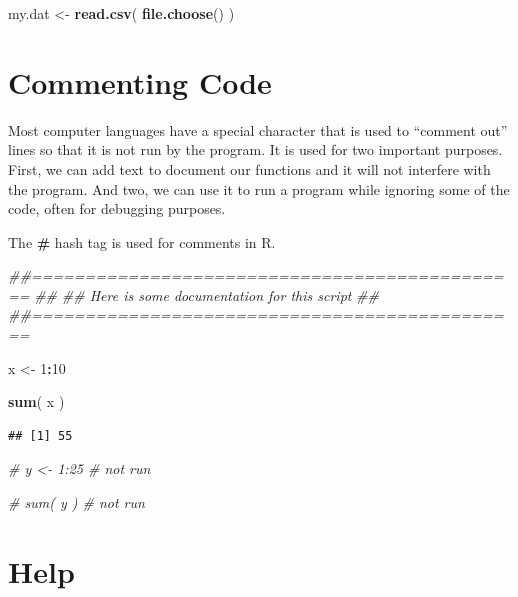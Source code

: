 \documentclass[]{book}
\newenvironment{Shaded}{\begin{snugshade}}{\end{snugshade}}
\newcommand{\CommentTok}[1]{\textcolor[rgb]{0.56,0.35,0.01}{\textit{#1}}}
\newcommand{\DecValTok}[1]{\textcolor[rgb]{0.00,0.00,0.81}{#1}}
\newcommand{\KeywordTok}[1]{\textcolor[rgb]{0.13,0.29,0.53}{\textbf{#1}}}
\newcommand{\NormalTok}[1]{#1}
\newcommand{\OperatorTok}[1]{\textcolor[rgb]{0.81,0.36,0.00}{\textbf{#1}}}
\newcommand{\StringTok}[1]{\textcolor[rgb]{0.31,0.60,0.02}{#1}}
\theoremstyle{definition}
\theoremstyle{definition}
\theoremstyle{definition}
\theoremstyle{remark}
\begin{document}
\begin{Shaded}
\begin{Highlighting}[]
\NormalTok{my.dat <-}\StringTok{ }\KeywordTok{read.csv}\NormalTok{( }\KeywordTok{file.choose}\NormalTok{() )}
\end{Highlighting}
\end{Shaded}

\hypertarget{commenting-code}{%
\section{Commenting Code}\label{commenting-code}}

Most computer languages have a special character that is used to
``comment out'' lines so that it is not run by the program. It is used
for two important purposes. First, we can add text to document our
functions and it will not interfere with the program. And two, we can
use it to run a program while ignoring some of the code, often for
debugging purposes.

The \textbf{\#} hash tag is used for comments in R.

\begin{Shaded}
\begin{Highlighting}[]
\CommentTok{##==============================================}
\CommentTok{##}
\CommentTok{##  Here is some documentation for this script}
\CommentTok{##}
\CommentTok{##==============================================}

\NormalTok{x <-}\StringTok{ }\DecValTok{1}\OperatorTok{:}\DecValTok{10}

\KeywordTok{sum}\NormalTok{( x )}
\end{Highlighting}
\end{Shaded}

\begin{verbatim}
## [1] 55
\end{verbatim}

\begin{Shaded}
\begin{Highlighting}[]
\CommentTok{# y <- 1:25     # not run}

\CommentTok{# sum( y )      # not run}
\end{Highlighting}
\end{Shaded}

\hypertarget{help}{%
\section{Help}\label{help}}
\end{document}
